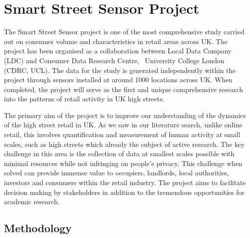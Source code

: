 \section{Smart Street Sensor Project}

The Smart Street Sensor project is one of the most comprehensive study carried out on consumer volume and characteristics in retail areas across UK.
The project has been organised as a collaboration between Local Data Company (LDC) and Consumer Data Research Centre,  University College London (CDRC, UCL).
The data for the study is generated independently within the project through sensors installed at around 1000 locations across UK.
When completed, the project will serve as the first and unique comprehensive research into the patterns of retail activity in UK high streets.

The primary aim of the project is to improve our understanding of the dynamics of the high street retail in UK.
As we saw in our literature search, unlike online retail, this involves quantification and measurement of human activity at small scales, such as high streets which already the subject of active research.
The key challenge in this area is the collection of data at smallest scales possible with minimal resources while not infringing on people’s privacy.
This challenge when solved can provide immense value to occupiers, landlords, local authorities, investors and consumers within the retail industry.
The project aims to facilitate decision making by stakeholders in addition to the tremendous opportunities for academic research.

\subsection{Methodology}

